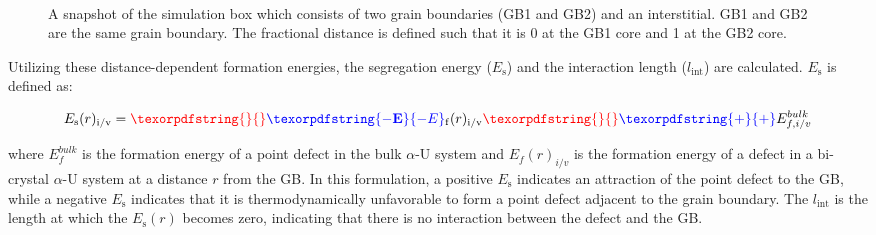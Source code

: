 \documentclass[review]{elsarticle}
\providecommand{\DIFaddtex}[1]{{\bf #1}} %
\providecommand{\DIFdeltex}[1]{} %
\providecommand{\DIFaddbegin}{\protect\color{blue}} %
\providecommand{\DIFaddend}{\protect\color{black}} %
\providecommand{\DIFdelbegin}{\protect\color{red}} %
\providecommand{\DIFdelend}{\protect\color{black}} %
\providecommand{\DIFaddbeginFL}{} %
\providecommand{\DIFaddendFL}{} %
\providecommand{\DIFdelbeginFL}{} %
\providecommand{\DIFdelendFL}{} %
\providecommand{\DIFadd}[1]{\texorpdfstring{\DIFaddtex{#1}}{#1}} %
\providecommand{\DIFdel}[1]{\texorpdfstring{\DIFdeltex{#1}}{}} %
\newcommand{\DIFscaledelfig}{0.5}
\newlength{\DIFdelgraphicswidth} %
\newlength{\DIFdelgraphicsheight} %
\newcommand{\DIFaddincludegraphics}[2][]{{\color{blue}\fbox{\DIFOincludegraphics[#1]{#2}}}} %
\newcommand{\DIFdelincludegraphics}[2][]{%
\sbox{\DIFdelgraphicsbox}{\DIFOincludegraphics[#1]{#2}}%
\settoboxwidth{\DIFdelgraphicswidth}{\DIFdelgraphicsbox} %
\settoboxtotalheight{\DIFdelgraphicsheight}{\DIFdelgraphicsbox} %
\scalebox{\DIFscaledelfig}{%
\parbox[b]{\DIFdelgraphicswidth}{\usebox{\DIFdelgraphicsbox}\\[-\baselineskip] \rule{\DIFdelgraphicswidth}{0em}}\llap{\resizebox{\DIFdelgraphicswidth}{\DIFdelgraphicsheight}{%
\setlength{\unitlength}{\DIFdelgraphicswidth}%
\begin{picture}(1,1)%
\thicklines\linethickness{2pt} %
{\color[rgb]{1,0,0}\put(0,0){\framebox(1,1){}}}%
{\color[rgb]{1,0,0}\put(0,0){\line( 1,1){1}}}%
{\color[rgb]{1,0,0}\put(0,1){\line(1,-1){1}}}%
\end{picture}%
}\hspace*{3pt}}} %
} %
\DeclareRobustCommand{\DIFaddbegin}{\DIFOaddbegin \let\includegraphics\DIFaddincludegraphics} %
\DeclareRobustCommand{\DIFaddend}{\DIFOaddend \let\includegraphics\DIFOincludegraphics} %
\DeclareRobustCommand{\DIFdelbegin}{\DIFOdelbegin \let\includegraphics\DIFdelincludegraphics} %
\DeclareRobustCommand{\DIFdelend}{\DIFOaddend \let\includegraphics\DIFOincludegraphics} %
\DeclareRobustCommand{\DIFaddbeginFL}{\DIFOaddbeginFL \let\includegraphics\DIFaddincludegraphics} %
\DeclareRobustCommand{\DIFaddendFL}{\DIFOaddendFL \let\includegraphics\DIFOincludegraphics} %
\DeclareRobustCommand{\DIFdelbeginFL}{\DIFOdelbeginFL \let\includegraphics\DIFdelincludegraphics} %
\DeclareRobustCommand{\DIFdelendFL}{\DIFOaddendFL \let\includegraphics\DIFOincludegraphics} %
\begin{document}
\begin{figure}[h!]
\centering
\DIFdelbeginFL %
\DIFdelendFL \DIFaddbeginFL {}\DIFaddendFL \\
\caption{A snapshot of the simulation box which consists of two grain boundaries (GB1 and GB2) and an interstitial. GB1 and GB2 are the same grain boundary. The fractional distance is defined such that it is 0 at the GB1 core and 1 at the GB2 core.}
\label{fig:GB}
\end{figure}

Utilizing these distance-dependent formation energies, the segregation energy ($E_{\mathrm{s}}$) and the interaction length ($l_{\mathrm{int}}$) are calculated. $E_{\mathrm{s}}$ is defined as:

\begin{equation}
\label{eq:eform2}
E_{\mathrm{s}}(r)_{\mathrm{i/v}} = \DIFdelbegin \DIFdel{E}\DIFdelend \DIFaddbegin \DIFadd{-E}\DIFaddend _{\mathrm{f}}(r)_{\mathrm{i/v}} \DIFdelbegin \DIFdel{- }\DIFdelend \DIFaddbegin \DIFadd{+ }\DIFaddend E_{f,i/v}^{bulk}
\end{equation}

\noindent where $E_{f}^{bulk}$ is the formation energy of a point defect in the bulk $\alpha$-U system and $E_f(r)_{i/v}$ is the formation energy of a defect in a bi-crystal $\alpha$-U system at a distance $r$ from the GB. In this formulation, a positive $E_{\mathrm{s}}$ indicates an attraction of the point defect to the GB, while a negative $E_{\mathrm{s}}$ indicates that it is thermodynamically unfavorable to form a point defect adjacent to the grain boundary. The  $l_{\mathrm{int}}$ is the length at which the $E_{\mathrm{s}}(r)$ becomes zero, indicating that there is no interaction between the defect and the GB.  
\end{document}
